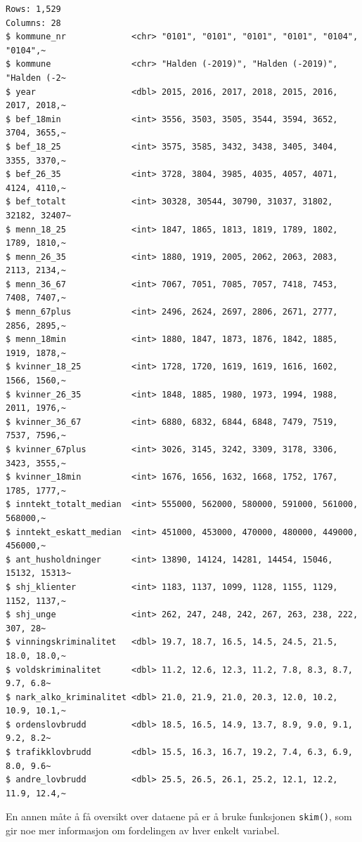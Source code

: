 \documentclass[
  letterpaper,
  DIV=11,
  numbers=noendperiod]{scrreprt}
\begin{document}
\begin{verbatim}
Rows: 1,529
Columns: 28
$ kommune_nr             <chr> "0101", "0101", "0101", "0101", "0104", "0104",~
$ kommune                <chr> "Halden (-2019)", "Halden (-2019)", "Halden (-2~
$ year                   <dbl> 2015, 2016, 2017, 2018, 2015, 2016, 2017, 2018,~
$ bef_18min              <int> 3556, 3503, 3505, 3544, 3594, 3652, 3704, 3655,~
$ bef_18_25              <int> 3575, 3585, 3432, 3438, 3405, 3404, 3355, 3370,~
$ bef_26_35              <int> 3728, 3804, 3985, 4035, 4057, 4071, 4124, 4110,~
$ bef_totalt             <int> 30328, 30544, 30790, 31037, 31802, 32182, 32407~
$ menn_18_25             <int> 1847, 1865, 1813, 1819, 1789, 1802, 1789, 1810,~
$ menn_26_35             <int> 1880, 1919, 2005, 2062, 2063, 2083, 2113, 2134,~
$ menn_36_67             <int> 7067, 7051, 7085, 7057, 7418, 7453, 7408, 7407,~
$ menn_67plus            <int> 2496, 2624, 2697, 2806, 2671, 2777, 2856, 2895,~
$ menn_18min             <int> 1880, 1847, 1873, 1876, 1842, 1885, 1919, 1878,~
$ kvinner_18_25          <int> 1728, 1720, 1619, 1619, 1616, 1602, 1566, 1560,~
$ kvinner_26_35          <int> 1848, 1885, 1980, 1973, 1994, 1988, 2011, 1976,~
$ kvinner_36_67          <int> 6880, 6832, 6844, 6848, 7479, 7519, 7537, 7596,~
$ kvinner_67plus         <int> 3026, 3145, 3242, 3309, 3178, 3306, 3423, 3555,~
$ kvinner_18min          <int> 1676, 1656, 1632, 1668, 1752, 1767, 1785, 1777,~
$ inntekt_totalt_median  <int> 555000, 562000, 580000, 591000, 561000, 568000,~
$ inntekt_eskatt_median  <int> 451000, 453000, 470000, 480000, 449000, 456000,~
$ ant_husholdninger      <int> 13890, 14124, 14281, 14454, 15046, 15132, 15313~
$ shj_klienter           <int> 1183, 1137, 1099, 1128, 1155, 1129, 1152, 1137,~
$ shj_unge               <int> 262, 247, 248, 242, 267, 263, 238, 222, 307, 28~
$ vinningskriminalitet   <dbl> 19.7, 18.7, 16.5, 14.5, 24.5, 21.5, 18.0, 18.0,~
$ voldskriminalitet      <dbl> 11.2, 12.6, 12.3, 11.2, 7.8, 8.3, 8.7, 9.7, 6.8~
$ nark_alko_kriminalitet <dbl> 21.0, 21.9, 21.0, 20.3, 12.0, 10.2, 10.9, 10.1,~
$ ordenslovbrudd         <dbl> 18.5, 16.5, 14.9, 13.7, 8.9, 9.0, 9.1, 9.2, 8.2~
$ trafikklovbrudd        <dbl> 15.5, 16.3, 16.7, 19.2, 7.4, 6.3, 6.9, 8.0, 9.6~
$ andre_lovbrudd         <dbl> 25.5, 26.5, 26.1, 25.2, 12.1, 12.2, 11.9, 12.4,~
\end{verbatim}

En annen måte å få oversikt over dataene på er å bruke funksjonen
\texttt{skim()}, som gir noe mer informasjon om fordelingen av hver
enkelt variabel.
\end{document}
